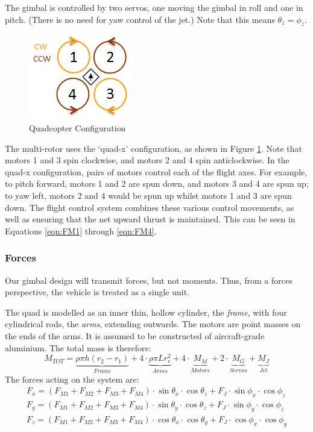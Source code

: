 \documentclass[11pt,twoside]{article}
\begin{document}
The gimbal is controlled by two servos, one moving the gimbal in roll and one in pitch. (There is no need for yaw control of the jet.)  Note that this means $\theta_z = \phi_z$.
\begin{figure}
    \begin{center}
        \includegraphics[width=0.48\linewidth]{Quad-X}
        \caption{Quadcopter Configuration}
        \label{fig:quad-x}
    \end{center}
\end{figure}
The multi-rotor uses the `quad-x' configuration, as shown in Figure \ref{fig:quad-x}. Note that motors 1 and 3 spin clockwise, and motors 2 and 4 spin anticlockwise. In the quad-x configuration, pairs of motors control each of the flight axes. For example, to pitch forward, motors 1 and 2 are spun down, and motors 3 and 4 are spun up; to yaw left, motors 2 and 4 would be spun up whilst motors 1 and 3 are spun down. The flight control system combines these various control movements, as well as ensuring that the net upward thrust is maintained. This can be seen in Equations \ref{eqn:FM1} through \ref{eqn:FM4}.


\subsubsection{Forces}\label{sec:Forces}
Our gimbal design will transmit forces, but not moments. Thus, from a forces perspective, the vehicle is treated as a single unit.

The quad is modelled as an inner thin, hollow cylinder, the \emph{frame}, with four cylindrical rods, the \emph{arms}, extending outwards. The motors are point masses on the ends of the arms. It is assumed to be constructed of aircraft-grade aluminium. The total mass is therefore:
\begin{equation}
    M_{TOT} = \underbrace{\rho\pi h (r_2-r_1)}_{Frame} + 4\cdot\underbrace{\rho\pi L r_r^2}_{Arms} + 4\cdot\underbrace{M_M}_{Motors} + 2\cdot\underbrace{M_G}_{Servos} + \underbrace{M_J}_{Jet} \label{eqn:total_mass}
\end{equation}
The forces acting on the system are:
\begin{eqnarray}
    F_x = (F_{M1} + F_{M2} + F_{M3} + F_{M4})\cdot\sin{\theta_x}\cdot\cos{\theta_z} +  F_J\cdot\sin{\phi_x}\cdot\cos{\phi_z} \\
    F_y = (F_{M1} + F_{M2} + F_{M3} + F_{M4})\cdot\sin{\theta_y}\cdot\cos{\theta_z} +  F_J\cdot\sin{\phi_y}\cdot\cos{\phi_z} \\
    F_z = (F_{M1} + F_{M2} + F_{M3} + F_{M4})\cdot\cos{\theta_x}\cdot\cos{\theta_y} +  F_J\cdot\cos{\phi_x}\cdot\cos{\phi_y}
\end{eqnarray}
\end{document}
